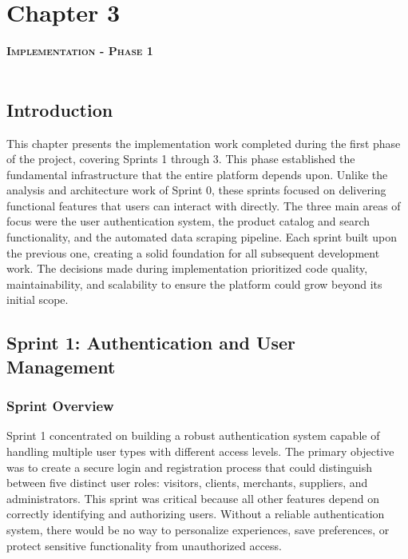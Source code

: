 \chapter*{Chapter 3}

\textsc{\textbf{\Huge Implementation - Phase 1}} \\ \\


\section*{Introduction}

This chapter presents the implementation work completed during
the first phase of the project, covering Sprints 1 through 3.
This phase established the fundamental infrastructure that
the entire platform depends upon. Unlike the analysis and
architecture work of Sprint 0, these sprints focused on
delivering functional features that users can interact with
directly. The three main areas of focus were the user
authentication system, the product catalog and search
functionality, and the automated data scraping pipeline.
Each sprint built upon the previous one, creating a solid
foundation for all subsequent development work. The decisions
made during implementation prioritized code quality,
maintainability, and scalability to ensure the platform could
grow beyond its initial scope.

\section*{Sprint 1: Authentication and User Management}

\subsection*{Sprint Overview}

Sprint 1 concentrated on building a robust authentication system
capable of handling multiple user types with different access
levels. The primary objective was to create a secure login and
registration process that could distinguish between five distinct
user roles: visitors, clients, merchants, suppliers, and
administrators. This sprint was critical because all other
features depend on correctly identifying and authorizing users.
Without a reliable authentication system, there would be no way
to personalize experiences, save preferences, or protect sensitive
functionality from unauthorized access.

